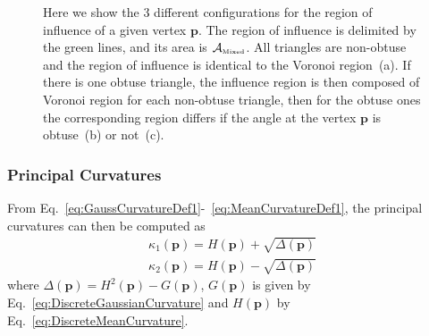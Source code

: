 \documentclass{InsightArticle}
\theoremstyle{plain}
\begin{document}
\begin{figure}[htbp]
  \centering
  \hspace{0.5cm}
  \hspace{0.5cm}
  \caption{Here we show the 3 different configurations for the region of influence of a given vertex $\mathbf{p}$. The region of influence is delimited by the green lines, and its area is $\mathcal{A}_{\text{\tiny{Mixed}}}$. All triangles are non-obtuse and the region of influence is identical to the Voronoi region~(a). If there is one obtuse triangle, the influence region is then composed of Voronoi region for each non-obtuse triangle, then for the obtuse ones the corresponding region differs if the angle at the vertex $\mathbf{p}$ is obtuse~(b) or not~(c).}
  \label{fig:mixed_area}
\end{figure}

\subsubsection{Principal Curvatures}
From Eq.~\ref{eq:GaussCurvatureDef1}-~\ref{eq:MeanCurvatureDef1}, the principal curvatures can then be computed as
\begin{eqnarray}
  \kappa_1( \mathbf{p} ) = H( \mathbf{p} ) + \sqrt{\Delta( \mathbf{p} )}\\
  \kappa_2( \mathbf{p} ) = H( \mathbf{p} ) - \sqrt{\Delta( \mathbf{p} )}
\end{eqnarray}
where $\Delta( \mathbf{p} ) = H^2( \mathbf{p} ) - G( \mathbf{p} )$, $G( \mathbf{p} )$ is given by Eq.~\ref{eq:DiscreteGaussianCurvature} and $H( \mathbf{p} )$ by Eq.~\ref{eq:DiscreteMeanCurvature}.
\end{document}
